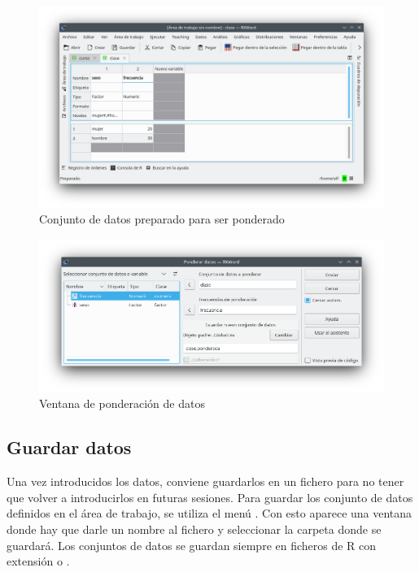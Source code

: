 \begin{figure}[htp]
\begin{center}
  \includegraphics[width=\textwidth]{capitulos/introduccion/img/datos_frecuencias}
  \caption{Conjunto de datos preparado para ser ponderado}
  \label{g:ponderar_variable1}
\end{center}
\end{figure}

\begin{figure}[htp]
\begin{center}
  \includegraphics[scale=0.6]{capitulos/introduccion/img/ponderacion}
  \caption{Ventana de ponderación de datos}
  \label{g:ponderar_variable2}
\end{center}
\end{figure}


\subsection{Guardar datos}
Una vez introducidos los datos, conviene guardarlos en un fichero para no tener que volver a introducirlos en futuras
sesiones. Para guardar los conjunto de datos definidos en el área de trabajo, se utiliza el menú .
Con esto aparece una ventana donde hay que darle un nombre al fichero y seleccionar la carpeta donde se guardará.
Los conjuntos de datos se guardan siempre en ficheros de R con extensión  o .

